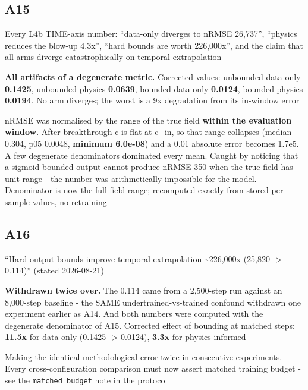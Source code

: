 \documentclass[10pt]{article}
\begin{document}
\subsection*{A15}\label{led:A15}
\begin{description}[leftmargin=0pt,itemsep=1pt]
\item[Claim withdrawn.] Every L4b TIME-axis number: ``data-only diverges to nRMSE 26,737'', ``physics reduces the blow-up 4.3x'', ``hard bounds are worth 226,000x'', and the claim that all arms diverge catastrophically on temporal extrapolation
\item[Replaced with.] \textbf{All artifacts of a degenerate metric.} Corrected values: unbounded data-only \textbf{0.1425}, unbounded physics \textbf{0.0639}, bounded data-only \textbf{0.0124}, bounded physics \textbf{0.0194}. No arm diverges; the worst is a 9x degradation from its in-window error
\item[Why it was wrong.] nRMSE was normalised by the range of the true field \textbf{within the evaluation window}. After breakthrough c is flat at c\_in, so that range collapses (median 0.304, p05 0.0048, \textbf{minimum 6.0e-08}) and a 0.01 absolute error becomes 1.7e5. A few degenerate denominators dominated every mean. Caught by noticing that a sigmoid-bounded output cannot produce nRMSE 350 when the true field has unit range - the number was arithmetically impossible for the model. Denominator is now the full-field range; recomputed exactly from stored per-sample values, no retraining
\end{description}
\subsection*{A16}\label{led:A16}
\begin{description}[leftmargin=0pt,itemsep=1pt]
\item[Claim withdrawn.] ``Hard output bounds improve temporal extrapolation \textasciitilde{}226,000x (25,820 -> 0.114)'' (stated 2026-08-21)
\item[Replaced with.] \textbf{Withdrawn twice over.} The 0.114 came from a 2,500-step run against an 8,000-step baseline - the SAME undertrained-vs-trained confound withdrawn one experiment earlier as A14. And both numbers were computed with the degenerate denominator of A15. Corrected effect of bounding at matched steps: \textbf{11.5x} for data-only (0.1425 -> 0.0124), \textbf{3.3x} for physics-informed
\item[Why it was wrong.] Making the identical methodological error twice in consecutive experiments. Every cross-configuration comparison must now assert matched training budget - see the \texttt{matched budget} note in the protocol
\end{description}
\end{document}
